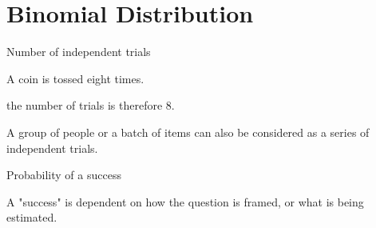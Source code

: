 \documentclass[a4paper,12pt]{article}
\begin{document}
\section{Binomial Distribution}


Number of independent trials

A coin is tossed eight times. 

 the number of trials is therefore 8.

A group of people or a batch of items can also be considered as a series of independent trials.



Probability of a success

A "success" is dependent on how the question is framed, or what is being estimated.
\end{document}
